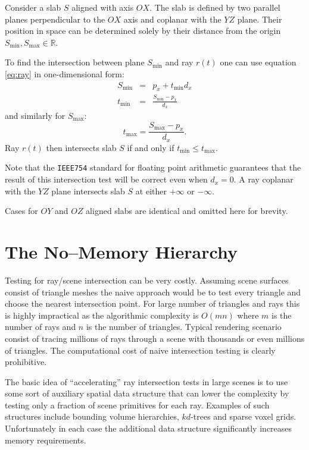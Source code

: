 Consider a slab $S$ aligned with axis $OX$. The slab is defined by two parallel planes perpendicular to the $OX$ axis and coplanar with the $YZ$ plane. Their position in space can be determined solely by their distance from the origin $S_{\min}, S_{\max} \in \mathbb{R}$.

To find the intersection between plane $S_{\min}$ and ray $r(t)$ one can use equation \ref{eq:ray} in one-dimensional form:
\begin{eqnarray}
  S_{\min} &=& p_{x} + t_{\min} d_{x} \nonumber \\
  t_{\min} &=& \frac{S_{\min} - p_{x}}{d_{x}}
\end{eqnarray}
and similarly for $S_{\max}$:
\begin{equation}
  t_{\max} = \frac{S_{\max} - p_{x}}{d_{x}}.
\end{equation}
Ray $r(t)$ then intersects slab $S$ if and only if $t_{\min} \le t_{\max}$.

Note that the \texttt{IEEE754} standard for floating point arithmetic guarantees that the result of this intersection test will be correct even when $d_{x}=0$. A ray coplanar with the $YZ$ plane intersects slab $S$ at either $+\infty$ or $-\infty$.

Cases for $OY$ and $OZ$ aligned slabs are identical and omitted here for brevity.

\section{The No--Memory Hierarchy}
\label{sec:nmh}
Testing for ray/scene intersection can be very costly. Assuming scene surfaces consist of triangle meshes the naive approach would be to test every triangle and choose the nearest intersection point. For large number of triangles and rays this is highly impractical as the algorithmic complexity is $O(mn)$ where $m$ is the number of rays and $n$ is the number of triangles. Typical rendering scenario consist of tracing millions of rays through a scene with thousands or even millions of triangles. The computational cost of naive intersection testing is clearly prohibitive.

The basic idea of ``accelerating'' ray intersection tests in large scenes is to use some sort of auxiliary spatial data structure that can lower the complexity by testing only a fraction of scene primitives for each ray. Examples of such structures include bounding volume hierarchies, $kd$-trees and sparse voxel grids. Unfortunately in each case the additional data structure significantly increases memory requirements.

